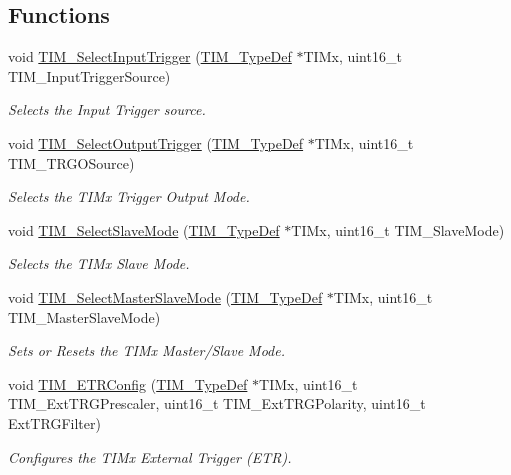 \subsection*{Functions}
\begin{DoxyCompactItemize}
\item 
void \hyperlink{group___t_i_m___group7_ga4252583c6ae8a73d6fc66f7e951dbc35}{T\+I\+M\+\_\+\+Select\+Input\+Trigger} (\hyperlink{struct_t_i_m___type_def}{T\+I\+M\+\_\+\+Type\+Def} $\ast$T\+I\+Mx, uint16\+\_\+t T\+I\+M\+\_\+\+Input\+Trigger\+Source)
\begin{DoxyCompactList}\small\item\em Selects the Input Trigger source. \end{DoxyCompactList}\item 
void \hyperlink{group___t_i_m___group7_ga28745aaa549e2067e42c19569209e6c6}{T\+I\+M\+\_\+\+Select\+Output\+Trigger} (\hyperlink{struct_t_i_m___type_def}{T\+I\+M\+\_\+\+Type\+Def} $\ast$T\+I\+Mx, uint16\+\_\+t T\+I\+M\+\_\+\+T\+R\+G\+O\+Source)
\begin{DoxyCompactList}\small\item\em Selects the T\+I\+Mx Trigger Output Mode. \end{DoxyCompactList}\item 
void \hyperlink{group___t_i_m___group7_ga2f19ce1d90990691cf037e419ba08003}{T\+I\+M\+\_\+\+Select\+Slave\+Mode} (\hyperlink{struct_t_i_m___type_def}{T\+I\+M\+\_\+\+Type\+Def} $\ast$T\+I\+Mx, uint16\+\_\+t T\+I\+M\+\_\+\+Slave\+Mode)
\begin{DoxyCompactList}\small\item\em Selects the T\+I\+Mx Slave Mode. \end{DoxyCompactList}\item 
void \hyperlink{group___t_i_m___group7_ga4dcc3d11b670c381d0ff9cb7e9fd01e2}{T\+I\+M\+\_\+\+Select\+Master\+Slave\+Mode} (\hyperlink{struct_t_i_m___type_def}{T\+I\+M\+\_\+\+Type\+Def} $\ast$T\+I\+Mx, uint16\+\_\+t T\+I\+M\+\_\+\+Master\+Slave\+Mode)
\begin{DoxyCompactList}\small\item\em Sets or Resets the T\+I\+Mx Master/\+Slave Mode. \end{DoxyCompactList}\item 
void \hyperlink{group___t_i_m___group7_ga8bdde400b7a30f3e747fe8e4962c0abe}{T\+I\+M\+\_\+\+E\+T\+R\+Config} (\hyperlink{struct_t_i_m___type_def}{T\+I\+M\+\_\+\+Type\+Def} $\ast$T\+I\+Mx, uint16\+\_\+t T\+I\+M\+\_\+\+Ext\+T\+R\+G\+Prescaler, uint16\+\_\+t T\+I\+M\+\_\+\+Ext\+T\+R\+G\+Polarity, uint16\+\_\+t Ext\+T\+R\+G\+Filter)
\begin{DoxyCompactList}\small\item\em Configures the T\+I\+Mx External Trigger (E\+TR). \end{DoxyCompactList}\end{DoxyCompactItemize}


